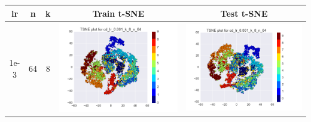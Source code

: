 \documentclass[12pt]{report}
\begin{document}
\begin{table}[H]
  \centering
  \begin{tabular}{ | c | c | c | c || c |}
    \hline
    \textbf{lr} & \textbf{n} & \textbf{k} & \textbf{Train t-SNE} & \textbf{Test t-SNE} \\ \hline 
    1e-3 & 64 & 8 &
    \begin{minipage}{.3\textwidth}
      \includegraphics[scale=0.25]{cd_lr_0_001_k_8_n_64.png}
    \end{minipage} &
    \begin{minipage}{.3\textwidth}
      \includegraphics[scale=0.25]{test_cd_lr_0_001_k_8_n_64.png}
    \end{minipage}

\end{tabular}
\end{table}
\end{document}
